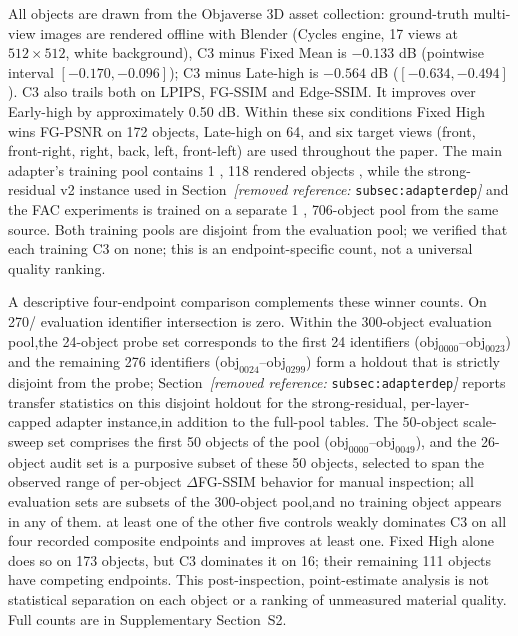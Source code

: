 \documentclass[times,twocolumn,final]{elsarticle}
\providecommand{\DIFadd}[1]{{\protect\color{blue} \sf #1}} %
\providecommand{\DIFdel}[1]{{\protect\color{red} \scriptsize #1}} %
\providecommand{\DIFaddbegin}{} %
\providecommand{\DIFaddend}{} %
\providecommand{\DIFdelbegin}{} %
\providecommand{\DIFdelend}{} %
\begin{document}
\DIFdel{All objects are drawn from the Objaverse 3D asset collection: ground-truth multi-view images are rendered offline with Blender (Cycles engine, 17 views at $512\times512$, white background), }\DIFdelend \DIFaddbegin \DIFadd{C3 minus Fixed Mean is $-0.133$ dB (pointwise interval $[-0.170,-0.096]$); C3 minus Late-high is $-0.564$ dB ($[-0.634,-0.494]$). C3 also trails both on LPIPS, FG-SSIM and Edge-SSIM. It improves over Early-high by approximately 0.50 dB. Within these six conditions Fixed High wins FG-PSNR on 172 objects, Late-high on 64, }\DIFaddend and \DIFdelbegin \DIFdel{six target views (front, front-right, right, back, left, front-left) are used throughout the paper. The main adapter's training pool contains 1}%
\DIFdel{, }%
\DIFdel{118 rendered objects , while the strong-residual v2 instance used in Section~\textit{[removed reference: }\texttt{subsec:adapterdep}\textit{]} and the FAC experiments is trained on a separate 1}%
\DIFdel{,}%
\DIFdel{706-object pool from the same source. Both training pools are disjoint from the evaluation pool; we verified that each training }\DIFdelend \DIFaddbegin \DIFadd{C3 on none; this is an endpoint-specific count, not a universal quality ranking.
}

\DIFadd{A descriptive four-endpoint comparison complements these winner counts. On 270}\DIFaddend /\DIFdelbegin \DIFdel{evaluation identifier intersection is zero. Within the 300-object evaluation pool,the 24-object probe set corresponds to the first 24 identifiers ($\mathrm{obj}_{0000}$--$\mathrm{obj}_{0023}$) and the remaining 276 identifiers ($\mathrm{obj}_{0024}$--$\mathrm{obj}_{0299}$) form a holdout that is strictly disjoint from the probe; Section~\textit{[removed reference: }\texttt{subsec:adapterdep}\textit{]} reports transfer statistics on this disjoint holdout for the strong-residual, per-layer-capped adapter instance,in addition to the full-pool tables. The 50-object scale-sweep set comprises the first 50 objects of the pool ($\mathrm{obj}_{0000}$--$\mathrm{obj}_{0049}$), and the 26-object audit set is a purposive subset of these 50 }\DIFdelend \DIFaddbegin \DIFadd{300 }\DIFaddend objects, \DIFdelbegin \DIFdel{selected to span the observed range of per-object $\Delta$FG-SSIM behavior for manual inspection; all evaluation sets are subsets of the 300-object pool,and no training object appears in any of them. }\DIFdelend \DIFaddbegin \DIFadd{at least one of the other five controls weakly dominates C3 on all four recorded composite endpoints and improves at least one. Fixed High alone does so on 173 objects, but C3 dominates it on 16; their remaining 111 objects have competing endpoints. This post-inspection, point-estimate analysis is not statistical separation on each object or a ranking of unmeasured material quality. Full counts are in Supplementary Section~S2.
}\DIFaddend 
\end{document}
